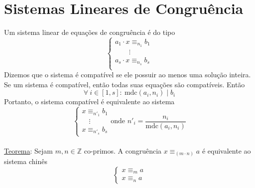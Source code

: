\documentclass{article}
\begin{document}
\section{Sistemas Lineares de Congruência}
Um sistema linear de equações de congruência é do tipo
\[
  \begin{cases}
    a_1 \cdot x \equiv_{n_1} b_1 \\
    \qquad \vdots \\
    a_s \cdot x \equiv_{n_s} b_s \\
  \end{cases}
\]
Dizemos que o sistema é compatível se ele possuir ao menos uma solução inteira. \\[5pt]
Se um sistema é compatível, então todas suas equações são compatíveis. Então
\[ \forall\: i \in [1, s]:\> \text{mdc}(a_i, n_i) \mid b_i \]
Portanto, o sistema compatível é equivalente ao sistema
\[
  \begin{cases}
    x \equiv_{n'_1} b_1 \\
    \quad \vdots \\
    x \equiv_{n'_s} b_s
  \end{cases}
  \text{onde } n'_i = \frac{n_i}{\text{mdc}(a_i, n_i)}
\]
\\[10pt]
\uline{Teorema}: Sejam $m, n \in \mathbb{Z}$ co-primos. A congruência $x \equiv_{(m \cdot n)} a$ é equivalente ao sistema chinês
\[
  \begin{cases}
    x \equiv_m a \\
    x \equiv_n a
  \end{cases}
\]

\end{document}
